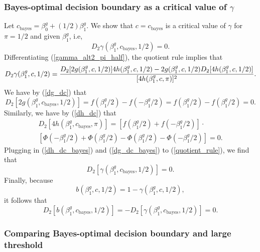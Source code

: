 \documentclass[12pt]{article}
\begin{document}
\subsubsection{Bayes-optimal decision boundary as a critical value of $\gamma$}\label{sec:bayes_opt}
Let $c_\textrm{bayes} = \beta^g_0 + (1/2)\beta^g_1.$ We show that $c = c_\textrm{bayes}$ is a critical value of $\gamma$ for $\pi = 1/2$ and given $\beta^g_1$, i.e, $$D_2 \gamma (\beta^g_1, c_\textrm{bayes}, 1/2) = 0.$$ Differentiating (\ref{gamma_alt2_pi_half}), the quotient rule implies that
\begin{equation}\label{quotient_rule}
D_2\gamma(\beta^g_1, c, 1/2) \\ = \frac{D_2[2g(\beta^g_1, c, 1/2)] 4h(\beta^g_1, c, 1/2) - 2g(\beta^g_1, c, 1/2) D_2[4h(\beta^g_1, c, 1/2)]}{[4h(\beta^g_1, c, \pi)]^2}.
\end{equation}
We have by (\ref{dg_dc}) that
\begin{equation}\label{dg_dc_bayes}
D_2[2g(\beta^g_1, c_\textrm{bayes}, 1/2)] = f( \beta^g_1/2) - f( -\beta^g_1/2) = f(\beta^g_1/2) - f(\beta^g_1/2) = 0.
\end{equation}
Similarly, we have by (\ref{dh_dc}) that
\begin{multline}\label{dh_dc_bayes}
D_2[4 h(\beta^g_1, c_\textrm{bayes}, \pi)] = [f( \beta^g_1/2) + f( -\beta^g_1/2)] \cdot \\ \left[  \Phi(-\beta^g_1/2) + \Phi(\beta^g_1/2) -  \Phi(\beta^g_1/2) - \Phi(-\beta^g_1/2) \right] = 0.
\end{multline}
Plugging in (\ref{dh_dc_bayes}) and (\ref{dg_dc_bayes}) to (\ref{quotient_rule}), we find that 
$$D_2[\gamma(\beta^g_1, c_\textrm{bayes}, 1/2)] = 0.$$ Finally, because
$$b(\beta^g_1, c, 1/2) = 1 - \gamma(\beta^g_1, c, 1/2),$$ it follows that
$$D_2[b(\beta^g_1, c_\textrm{bayes}, 1/2)] = -D_2[\gamma(\beta^g_1, c_\textrm{bayes}, 1/2)] = 0.$$

\subsubsection{Comparing Bayes-optimal decision boundary and large threshold}\label{sec:comparison}
\end{document}
